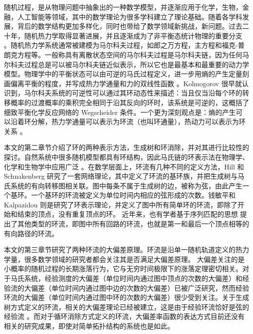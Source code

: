 

随机过程，是从物理问题中抽象出的一种数学模型，并逐渐应用于化学，生物，金融，人工智能等领域，其中的数学理论为很多学科建立了理论基础。随着各学科发展，背后的数学结构更加多样化，同时也带给了数学领域新挑战，新问题。过去二十年，随机热力学取得显著进展，并且逐渐成为了非平衡态统计物理的重要分支 \cite{annurev-conmatphys,Seifert_2012,VANDENBROECK20156} 。随机热力学系统通常被建模为马尔科夫过程，如郎之万方程，主方程和福克-普朗克方程等。一般称具有离散状态空间的马尔科夫过程是马尔科夫链，因为任何马尔科夫过程总是可以被马尔科夫链近似表示，所以它也是最基本和最重要的动力学模型。物理学中的平衡状态可以由可逆的马氏过程定义，进一步用熵的产生定量刻画偏离平衡的程度，并写成热力学通量和力的双线性函数 \cite{PhysRev.91.1505}。Kolmogorov \cite{Math.Ann.112} 很早就认识到，马尔科夫系统的可逆性可以通过其环动态性来描述：当且仅当沿每个环的转移概率的过渡概率的乘积完全相同于沿其反向的环时，该系统是可逆的，这概括了细致平衡化学反应网络的 Wegscheider 条件。一个更为深刻观点是：熵的产生可以沿着环分解，热力学通量可以表示为环流（也叫环通量），热动力可以表示为环关系 \cite{Schnakenberg1976NetworkTO}。

本文的第二章节介绍了环的两种表示方法，生成树和环消除，并对其进行比较性的探讨。自然系统中很多随机模型都具有环结构，因此马氏链的环表示法在物理学、化学和生物学中应用广泛 \cite{ZHANG20121,GE201287}。在数学层面上，环流有几种不同的定义方法，Hill \cite{Hill1966StudiesIIa,Hill1966StudiesIIb,hill2013free} 和 Schnakenberg \cite{Schnakenberg1976NetworkTO} 研究了一套网络理论，其中定义了环流的基环族，并把生成树与马氏系统的有向转移图相关联。图中每条不属于生成树的边，被称为弦，由此产生一个基环。一个基环的环流被定义为单位时间内相应的弦形成的次数。钱敏平\cite{minping1982circulation,jian1984circulations,jiang2004mathematical}和 Kalpazidou \cite{kalpazidou2007cycle} 则是研究了环表示理论，并定义了图中所有简单环的环流，即除了开始和结束的顶点，没有重复顶点的环。
近年来，也有学者基于序列匹配的思想 \cite{roldan2019exact,biddle2020reversal,pietzonka2021cycle} 提出了其他类型的环流，即图中所有回路的环流，也就是第一和最后一个顶点相等的有向路径的环流。

本文的第三章节研究了两种环流的大偏差原理。环流是沿单一随机轨道定义的热力学量，很多数学领域的研究者都会关注其是否满足大偏差原理\cite{varadhan1984large,den2000large}。
大偏差关注的是小概率的随机过程的长期涨落行为，它与无穷时间极限下的涨落定理密切相关。对于马氏系统，经验测度的大偏差（单位时间内通过图中顶点的次数的大偏差）和经验流的大偏差（单位时间内通过图中边的次数的大偏差）已被广泛研究，然而经验环流的大偏差（单位时间内通过图中环的次数的大偏差）很少受到关注。关于生成树方式定义的环流，相关的大偏差理论已经被建立，这是由于经验环流恰好是弦的经验流 \cite{bertini2015flows,bertini2015large}。而对于循环消除方式定义的环流，大偏差率函数的表达方式目前还没有相关的研究成果，即使对简单拓扑结构的系统也是如此。

